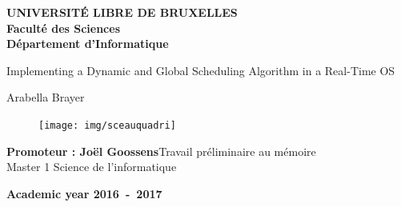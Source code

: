 \documentclass[11pt,a4paper,oneside]{report}
\begin{document}
	\begin{titlepage}
		
		
		\begin{center}
			\textbf{UNIVERSITÉ LIBRE DE BRUXELLES}\\
			\textbf{Faculté des Sciences}\\
			\textbf{Département d'Informatique}
			\vfill{}\vfill{}
			
			{\Huge  Implementing a Dynamic and Global Scheduling Algorithm  \vspace*{.5cm}  \linebreak[4] in a Real-Time OS}
			
			{\Huge \par}
			\begin{center}{\LARGE Arabella Brayer}\end{center}{\Huge \par}
			
			\vfill{}
			
			\begin{figure}[h]
				\begin{center}
					\texttt{[image: img/sceauquadri]}
					\label{fig:sceauquadri}
				\end{center}
			\end{figure}
			\vfill{}
			
			
			
			\begin{flushright}{\large \textbf{Promoteur : Joël Goossens}}\hfill{}{\large Travail préliminaire au mémoire}\\
				{
				}\hfill{}{\large Master 1}\medskip
				\hfill{}{\large Science de l'informatique}\end{flushright}{\large\par}
			\vfill{}\vfill{}\enlargethispage{3cm}
			\textbf{Academic year 2016~-~2017}
		\end{center}
	\end{titlepage}
	\newpage
	\thispagestyle{empty} 
	\null
	
	\newenvironment{vcenterpage}
	{\newpage\thispagestyle{empty} 
		\vspace*{\fill}}
	{\vspace*{\fill}\par\pagebreak}
	
	\thispagestyle{empty} 
	\setcounter{page}{0}
	\tableofcontents
	
\end{document}
